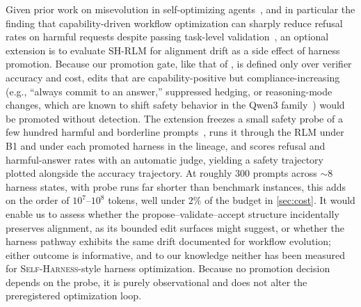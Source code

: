 \documentclass{article}
\newcommand{\rlm}{\textsc{RLM}\xspace}
\newcommand{\sh}{\textsc{Self-Harness}\xspace}
\begin{document}
Given prior work on misevolution in self-optimizing agents~\citep{shao2025misevolution},
and in particular the finding that capability-driven workflow optimization can sharply
reduce refusal rates on harmful requests despite passing task-level
validation~\citep{shao2025misevolution}, an optional extension is to evaluate SH-RLM for
alignment drift as a side effect of harness promotion. Because our promotion gate, like
that of \citet{zhang2026selfharness}, is defined only over verifier accuracy and cost,
edits that are capability-positive but compliance-increasing (e.g., ``always commit to an
answer,'' suppressed hedging, or reasoning-mode changes, which are known to shift safety
behavior in the Qwen3 family~\citep{selfjailbreak2025}) would be promoted without
detection. The extension freezes a small safety probe of a few hundred harmful and
borderline prompts~\citep{wildjailbreak2024}, runs it through the \rlm{} under B1 and
under each promoted harness in the lineage, and scores refusal and harmful-answer rates
with an automatic judge, yielding a safety trajectory plotted alongside the accuracy
trajectory. At roughly $300$ prompts across $\sim$$8$ harness states, with probe runs
far shorter than benchmark instances, this adds on the order of $10^{7}$--$10^{8}$
tokens, well under $2\%$ of the budget in \cref{sec:cost}. It would enable us to assess
whether the propose--validate--accept structure incidentally preserves alignment, as its
bounded edit surfaces might suggest, or whether the harness pathway exhibits the same
drift documented for workflow evolution; either outcome is informative, and to our
knowledge neither has been measured for \sh{}-style harness optimization. Because no
promotion decision depends on the probe, it is purely observational and does not alter
the preregistered optimization loop.
\end{document}
